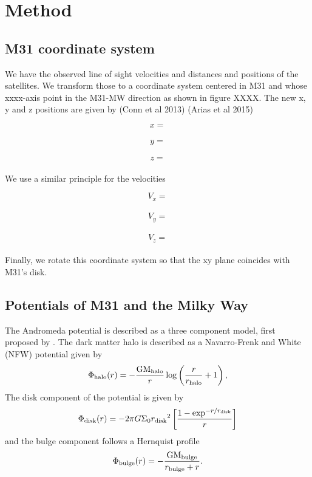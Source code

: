 \documentclass[useAMS,usenatbib]{mn2e}
\begin{document}
\section{Method}
\label{Method}
\subsection{M31 coordinate system}
We have the observed line of sight velocities and distances and positions of the satellites. 
We transform those to a coordinate system centered in M31 and whose xxxx-axis point in the M31-MW direction as shown in figure XXXX.
The new x, y and z positions are given by (Conn et al 2013) (Arias et al 2015)\citep{2013ApJ...766..120C,2013Natur.493...62I}

\begin{equation}
x =
\end{equation}\\
\begin{equation}
y =
\end{equation}\\
\begin{equation}
z =
\end{equation}\\

We use a similar principle for the velocities 

\begin{equation}
V_x =
\end{equation}\\
\begin{equation}
V_y =
\end{equation}\\
\begin{equation}
V_z =
\end{equation}\\

Finally, we rotate this coordinate system so that the xy plane coincides with M31's disk.  

\subsection{Potentials of M31 and the Milky Way}
The Andromeda potential is described as a three component model, first proposed by \cite{2006MNRAS.366..996G}.  
The dark matter halo is described as a Navarro-Frenk and White (NFW) potential \citep{1997ApJ...490..493N} given by
\begin{equation}
\Phi_{\rm{halo}}(r)=-\frac{\rm{GM_{\rm{halo}}}}{r}\log \left(\frac{r}{r_{\rm{halo}}}+1\right),
\label{NFW}
\end{equation}   
The disk component of the potential is given by
\begin{equation}
\Phi_{\rm{disk}}(r)=-2{\pi}G\Sigma_{0}{r_{\rm{disk}}}^2\left[\frac{1-\exp^{-r/r_{\rm{disk}}}}{r}\right]
\end{equation}   
and the bulge component follows a Hernquist profile \citep{1990ApJ...356..359H}
\begin{equation}
\Phi_{\rm{bulge}}(r)=-\frac{\rm{GM_{{bulge}}}}{r_{\rm{bulge}}+r}\mbox{.}
\label{Hernquist}
\end{equation}\\
\end{document}
